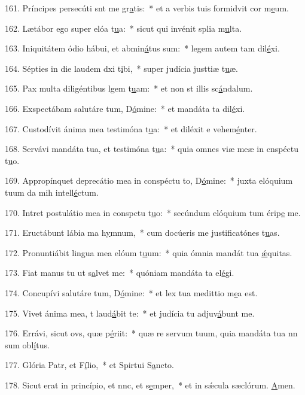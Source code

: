161. Príncipes persecúti snt me gr\uline{a}tis:~* et a verbis tuis formidvit cor m\uline{e}um.\par 
162. Lætábor ego super elóa t\uline{u}a:~* sicut qui invénit splia m\uline{u}lta.\par 
163. Iniquitátem ódio hábui, et abmin\uline{á}tus sum:~* legem autem tam dil\uline{é}xi.\par 
164. Sépties in die laudem dxi t\uline{i}bi,~* super judícia justtiæ t\uline{u}æ.\par 
165. Pax multa diligéntibus lgem t\uline{u}am:~* et non st illis sc\uline{á}ndalum.\par 
166. Exspectábam salutáre tum, D\uline{ó}mine:~* et mandáta ta dil\uline{é}xi.\par 
167. Custodívit ánima mea testimóna t\uline{u}a:~* et diléxit e vehem\uline{é}nter.\par 
168. Servávi mandáta tua, et testimóna t\uline{u}a:~* quia omnes viæ meæ in cnspéctu t\uline{u}o.\par 
169. Appropínquet deprecátio mea in conspéctu to, D\uline{ó}mine:~* juxta elóquium tuum da mih intell\uline{é}ctum.\par 
170. Intret postulátio mea in conspctu t\uline{u}o:~* secúndum elóquium tum érip\uline{e} me.\par 
171. Eructábunt lábia ma h\uline{y}mnum,~* cum docúeris me justificatónes t\uline{u}as.\par 
172. Pronuntiábit lingua mea elóum t\uline{u}um:~* quia ómnia mandát tua \uline{ǽ}quitas.\par 
173. Fiat manus tu ut s\uline{a}lvet me:~* quóniam mandáta ta el\uline{é}gi.\par 
174. Concupívi salutáre tum, D\uline{ó}mine:~* et lex tua medittio m\uline{e}a est.\par 
175. Vivet ánima mea, t laud\uline{á}bit te:~* et judícia tu adjuv\uline{á}bunt me.\par 
176. Errávi, sicut ovs, quæ p\uline{é}riit:~* quæ re servum tuum, quia mandáta tua nn sum obl\uline{í}tus.\par 
177. Glória Patr, et F\uline{í}lio,~* et Spirtui S\uline{a}ncto.\par 
178. Sicut erat in princípio, et nnc, et s\uline{e}mper,~* et in sǽcula sæclórum. \uline{A}men.\par 
